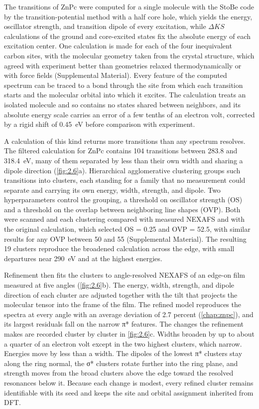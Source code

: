 The transitions of ZnPc were computed for a single molecule with the StoBe code by the transition-potential method with a half core hole, which yields the energy, oscillator strength, and transition dipole of every excitation, while \(\Delta KS\) calculations of the ground and core-excited states fix the absolute energy of each excitation center.\autocite{murciaQuantitativeBondTraceableResonant2026} One calculation is made for each of the four inequivalent carbon sites, with the molecular geometry taken from the crystal structure, which agreed with experiment better than geometries relaxed thermodynamically or with force fields (Supplemental Material). Every feature of the computed spectrum can be traced to a bond through the site from which each transition starts and the molecular orbital into which it excites. The calculation treats an isolated molecule and so contains no states shared between neighbors, and its absolute energy scale carries an error of a few tenths of an electron volt, corrected by a rigid shift of \qty{0.45}{eV} before comparison with experiment.

A calculation of this kind returns more transitions than any spectrum resolves. The filtered calculation for ZnPc contains 104 transitions between 283.8 and \qty{318.4}{eV}, many of them separated by less than their own width and sharing a dipole direction (\cref{fig:2.6}a). Hierarchical agglomerative clustering groups such transitions into clusters, each standing for a family that no measurement could separate and carrying its own energy, width, strength, and dipole. Two hyperparameters control the grouping, a threshold on oscillator strength (OS) and a threshold on the overlap between neighboring line shapes (OVP). Both were scanned and each clustering compared with measured NEXAFS and with the original calculation, which selected OS = 0.25 and OVP = 52.5, with similar results for any OVP between 50 and 55 (Supplemental Material). The resulting 19 clusters reproduce the broadened calculation across the edge, with small departures near \qty{290}{eV} and at the highest energies.

Refinement then fits the clusters to angle-resolved NEXAFS of an edge-on film measured at five angles (\cref{fig:2.6}b). The energy, width, strength, and dipole direction of each cluster are adjusted together with the tilt that projects the molecular tensor into the frame of the film. The refined model reproduces the spectra at every angle with an average deviation of 2.7 percent (\cref{chap:znpc}), and its largest residuals fall on the narrow π* features. The changes the refinement makes are recorded cluster by cluster in \cref{fig:2.6}c. Widths broaden by up to about a quarter of an electron volt except in the two highest clusters, which narrow. Energies move by less than a width. The dipoles of the lowest π* clusters stay along the ring normal, the σ* clusters rotate further into the ring plane, and strength moves from the broad clusters above the edge toward the resolved resonances below it. Because each change is modest, every refined cluster remains identifiable with its seed and keeps the site and orbital assignment inherited from DFT.

